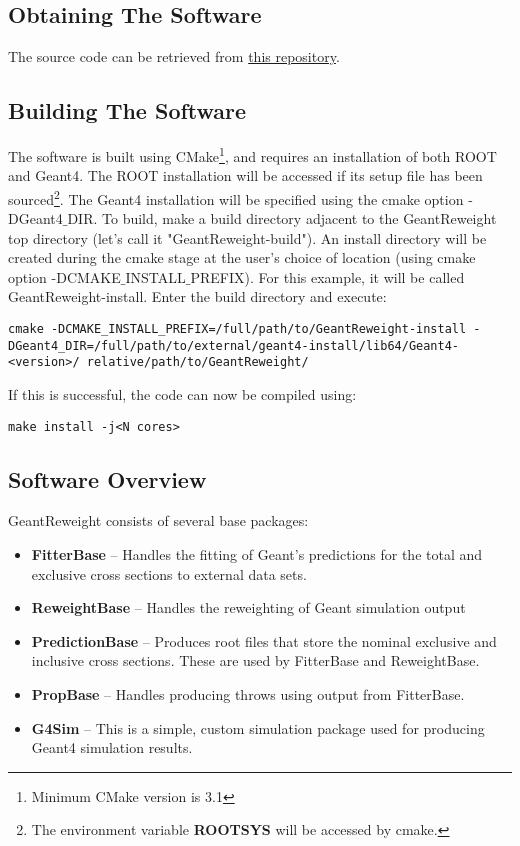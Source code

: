 \documentclass[12pt]{article}
\begin{document}
\subsection{Obtaining The Software}

The source code can be retrieved from \href{https://github.com/calcuttj/GeantReweight}{this repository}.

\subsection{Building The Software}

The software is built using CMake\footnote{Minimum CMake version is 3.1}, and requires an installation of both ROOT and Geant4. The ROOT installation will be accessed if its setup file has been sourced\footnote{The environment variable \textbf{ROOTSYS} will be accessed by cmake.}. The Geant4 installation will be specified using the cmake option -DGeant4$\_$DIR. To build, make a build directory adjacent to the GeantReweight top directory (let's call it "GeantReweight-build"). An install directory will be created during the cmake stage at the user's choice of location (using cmake option -DCMAKE$\_$INSTALL$\_$PREFIX). For this example, it will be called GeantReweight-install. Enter the build directory and execute:
\begin{lstlisting}
cmake -DCMAKE_INSTALL_PREFIX=/full/path/to/GeantReweight-install -DGeant4_DIR=/full/path/to/external/geant4-install/lib64/Geant4-<version>/ relative/path/to/GeantReweight/
\end{lstlisting}

If this is successful, the code can now be compiled using:
\begin{lstlisting}
make install -j<N cores>
\end{lstlisting}

\subsection{Software Overview}

GeantReweight consists of several base packages:
\begin{itemize}
	\item \textbf{FitterBase} -- Handles the fitting of Geant's predictions for the total and exclusive cross sections to external data sets.
	\item \textbf{ReweightBase} -- Handles the reweighting of Geant simulation output
	\item \textbf{PredictionBase} -- Produces root files that store the nominal exclusive and inclusive cross sections. These are used by FitterBase and ReweightBase. 
	\item \textbf{PropBase} -- Handles producing throws using output from FitterBase.
	\item \textbf{G4Sim} -- This is a simple, custom simulation package used for producing Geant4 simulation results.
\end{itemize}
\end{document}
